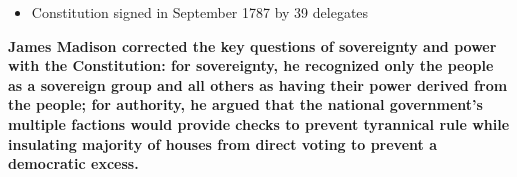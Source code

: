 \documentclass[a4paper]{article}
\begin{document}
{\begin{itemize}
\begin{itemize}
\begin{itemize}
                        \item Only House of Representatives elected directly by the people; remainder given various levels of insulation 
                    \end{itemize}
                \end{itemize}
                \item Constitution signed in September 1787 by 39 delegates
        \end{itemize}
        \textbf{James Madison corrected the key questions of sovereignty and power with the Constitution: for sovereignty, he recognized only the people as a sovereign group and all others as having their power derived from the people; for authority, he argued that the national government's multiple factions would provide checks to prevent tyrannical rule while insulating majority of houses from direct voting to prevent a democratic excess.}}
\end{document}
